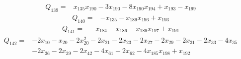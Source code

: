 \begin{equation*}\begin{aligned}
Q_{139}={}& x_{135}x_{190}-3x_{190}-8x_{190}x_{194}+x_{193}-x_{199}
\end{aligned}\end{equation*}
\begin{equation*}\begin{aligned}
Q_{140}={}& -x_{135}-x_{189}x_{196}+x_{193}
\end{aligned}\end{equation*}
\begin{equation*}\begin{aligned}
Q_{141}={}& -x_{184}-x_{186}-x_{189}x_{197}+x_{191}
\end{aligned}\end{equation*}
\begin{equation*}\begin{aligned}
Q_{142}={}& -2x_{10}-x_{20}-2x_{20}^{2}-2x_{21}-2x_{23}-2x_{27}-2x_{29}-2x_{31}-2x_{33}-4x_{35}\\
& -2x_{36}-2x_{39}-2x_{42}-4x_{61}-2x_{62}-4x_{185}x_{198}+x_{192}
\end{aligned}\end{equation*}
